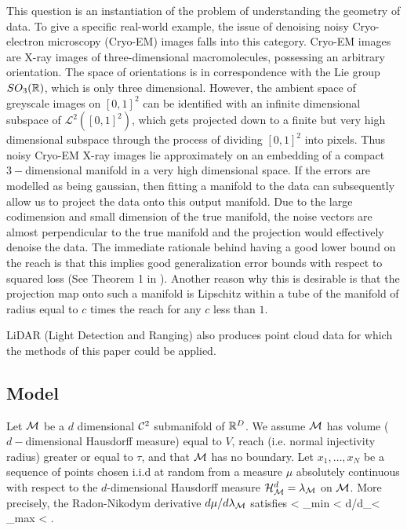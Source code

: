 \documentclass[final, 12pt]{colt2018} %
\begin{document}
This question is an instantiation of the problem of understanding the geometry of data. To give a specific real-world example, the issue of denoising noisy Cryo-electron microscopy (Cryo-EM) images falls into this category.
Cryo-EM images are X-ray images of three-dimensional macromolecules, possessing an arbitrary orientation. The space of orientations is in correspondence with the Lie group $SO_3(\mathbb R)$, which is only three dimensional. However, the ambient space of greyscale images on $[0, 1]^2$ can be identified with an infinite dimensional subspace of $\mathcal{L}^2([0, 1]^2)$, which gets projected down to a finite but very high dimensional subspace through the process of dividing $[0, 1]^2$ into pixels. Thus noisy Cryo-EM X-ray images lie approximately on an embedding of a compact $3-$dimensional manifold in a very high dimensional space. If the errors are modelled as being gaussian, then fitting a manifold to the data can subsequently allow us to project the data onto this output manifold. Due to the large codimension and small dimension of the true  manifold,  the noise vectors are almost perpendicular to the true manifold and the projection would effectively denoise the data. The immediate rationale behind having a good lower bound on the reach is that this implies good generalization error bounds with respect to squared loss (See Theorem 1 in \cite{FMN}). Another reason why this is desirable is that the projection map onto such a manifold is Lipschitz within a tube of the manifold of radius equal to $c$ times the reach for any $c$ less than $1$. 

LiDAR (Light Detection and Ranging) also produces point cloud data for which the methods of this paper could be applied.



\subsection{Model}
Let $\mathcal M$ be a $d$ dimensional $\mathcal{C}^2$ submanifold of  $\mathbb R^D$. We assume $\mathcal M$ has volume ($d-$dimensional Hausdorff measure) equal to $V$, reach (i.e. normal injectivity radius) greater or equal to $\tau$, and that $\mathcal M$ has no boundary. Let $x_1, \dots, x_N$ be a sequence of points chosen i.i.d at random from a measure $\mu$ absolutely continuous with respect to the $d$-dimensional Hausdorff measure $\mathcal{H}^d_\mathcal M = \lambda_\mathcal M$ on $\mathcal M$. More precisely, the Radon-Nikodym derivative $d\mu/d\lambda_\mathcal M$ satisfies  < \rho_{min} < d\mu/d\la_\MM < \rho_{max} < \infty. \eeq 
\end{document}
